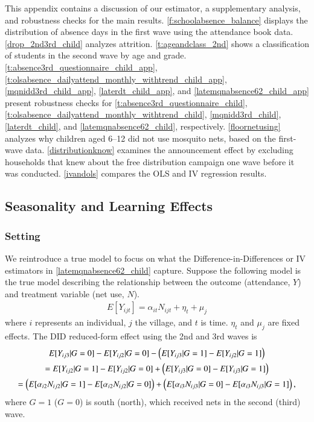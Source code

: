 \documentclass[fleqn,11pt]{article}
\begin{document}
This appendix contains a discussion of our estimator, a supplementary analysis, and robustness checks for the main results. \autoref{f:schoolabsence_balance} displays the distribution of absence days in the first wave using the attendance book data. \autoref{drop_2nd3rd_child} analyzes attrition. \autoref{t:ageandclass_2nd} shows a classification of students in the second wave by age and grade. \autoref{t:absence3rd_questionnaire_child_app}, \autoref{t:olsabsence_dailyattend_monthly_withtrend_child_app}, \autoref{mqnidd3rd_child_app}, \autoref{laterdt_child_app}, and \autoref{latemqnabsence62_child_app} present robustness checks for \autoref{t:absence3rd_questionnaire_child}, \autoref{t:olsabsence_dailyattend_monthly_withtrend_child}, \autoref{mqnidd3rd_child}, \autoref{laterdt_child}, and \autoref{latemqnabsence62_child}, respectively.  \autoref{floornetusing} analyzes why children aged 6--12 did not use mosquito nets, based on the first-wave data. \autoref{distributionknow} examines the announcement effect by excluding households that knew about the free distribution campaign one wave before it was conducted. \autoref{ivandols} compares the OLS and IV regression results. 

\subsection{Seasonality and Learning Effects}
\subsubsection{Setting}
We reintroduce a true model to focus on what the Difference-in-Differences or IV estimators in \autoref{latemqnabsence62_child} capture. Suppose the following model is the true model describing the relationship between the outcome (attendance, $Y$) and treatment variable (net use, $N$).
\begin{gather*}
E[Y_{ijt}] = \alpha_{it} N_{ijt} + \eta_{t} + \mu_{j} 
\end{gather*}
where $i$ represents an individual, $j$ the village, and $t$ is time. $\eta_{t} $ and $\mu_{j}$ are fixed effects.
The DID reduced-form effect using the 2nd and 3rd waves is
\begin{gather}
E[Y_{ij3}|G=0] - E[Y_{ij2}|G=0]  - \left(E[Y_{ij3}|G=1] - E[Y_{ij2}|G=1] \right) \notag \\
=E[Y_{ij2}|G=1] - E[Y_{ij2}|G=0]  + \left(E[Y_{ij3}|G=0] - E[Y_{ij3}|G=1] \right)\notag \\
 =  \left( E[\alpha_{i2} N_{ij2}|G=1]   - E[\alpha_{i2}N_{ij2}|G=0]\right) +  \left(  E[\alpha_{i3}N_{ij3}|G=0] - E[\alpha_{i3} N_{ij3}|G=1]  \right),
\end{gather}
where $G=1$ ($G=0$) is south (north), which received nets in the second (third) wave. 
\end{document}
